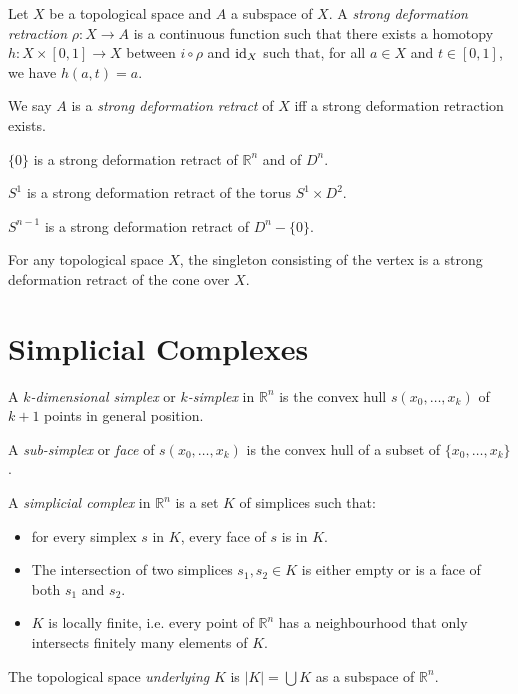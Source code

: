 \begin{df}
Let $X$ be a topological space and $A$ a subspace of $X$. A \emph{strong deformation retraction} $\rho : X \rightarrow A$ is a continuous function such that there exists a homotopy $h : X \times [0,1] \rightarrow X$ between $i \circ \rho$ and $\mathrm{id}_{X}$ such that, for all $a \in X$ and $t \in [0,1]$, we have $h(a,t) = a$.

We say $A$ is a \emph{strong deformation retract} of $X$ iff a strong deformation retraction exists.
\end{df}

\begin{ex}
$\{0\}$ is a strong deformation retract of $\mathbb{R}^n$ and of $D^n$.
\end{ex}

\begin{ex}
$S^1$ is a strong deformation retract of the torus $S^1 \times D^2$.
\end{ex}

\begin{ex}
$S^{n-1}$ is a strong deformation retract of $D^n - \{0\}$.
\end{ex}

\begin{ex}
For any topological space $X$, the singleton consisting of the vertex is a strong deformation retract of the cone over $X$.
\end{ex}

\chapter{Simplicial Complexes}

\begin{df}[Simplex]
A \emph{$k$-dimensional simplex} or \emph{$k$-simplex} in $\mathbb{R}^n$ is the convex hull $s(x_0, \ldots, x_k)$ of $k+1$ points in general position.
\end{df}

\begin{df}[Face]
A \emph{sub-simplex} or \emph{face} of $s(x_0, \ldots, x_k)$ is the convex hull of a subset of $\{x_0, \ldots, x_k\}$.
\end{df}

\begin{df}
A \emph{simplicial complex} in $\mathbb{R}^n$ is a set $K$ of simplices such that:
\begin{itemize}
\item for every simplex $s$ in $K$, every face of $s$ is in $K$.
\item The intersection of two simplices $s_1, s_2 \in K$ is either empty or is a face of both $s_1$ and $s_2$.
\item $K$ is locally finite, i.e. every point of $\mathbb{R}^n$ has a neighbourhood that only intersects finitely many elements of $K$.
\end{itemize}

The topological space \emph{underlying} $K$ is $|K| = \bigcup K$ as a subspace of $\mathbb{R}^n$.
\end{df}

